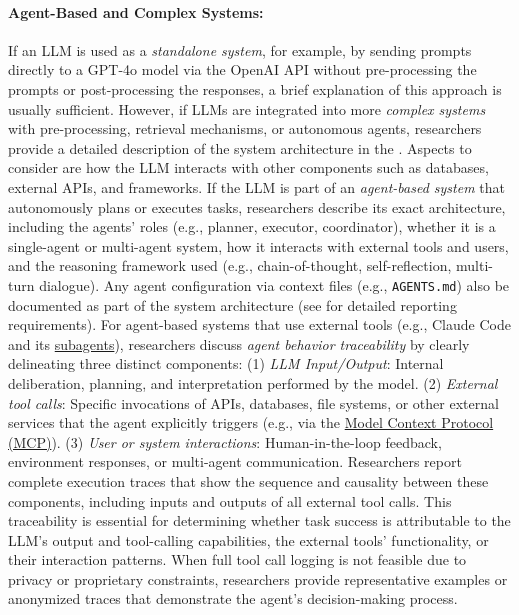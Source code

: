 \paragraph{Agent-Based and Complex Systems:}
If an LLM is used as a \emph{standalone system}, for example, by sending prompts directly to a GPT-4o model via the OpenAI API without pre-processing the prompts or post-processing the responses, a brief explanation of this approach is usually sufficient.
However, if LLMs are integrated into more \emph{complex systems} with pre-processing, retrieval mechanisms, or autonomous agents, researchers \must provide a detailed description of the system architecture in the \paper.
Aspects to consider are how the LLM interacts with other components such as databases, external APIs, and frameworks.
If the LLM is part of an \emph{agent-based system} that autonomously plans or executes tasks, researchers \must describe its exact architecture, including the agents' roles (e.g., planner, executor, coordinator), whether it is a single-agent or multi-agent system, how it interacts with external tools and users, and the reasoning framework used (e.g., chain-of-thought, self-reflection, multi-turn dialogue).
Any agent configuration via context files (e.g., \texttt{AGENTS.md}) \should also be documented as part of the system architecture (see \prompts for detailed reporting requirements).
For agent-based systems that use external tools (e.g., Claude Code and its \href{https://docs.anthropic.com/en/docs/claude-code/sub-agents}{subagents}), researchers \must discuss \emph{agent behavior traceability} by clearly delineating three distinct components: (1) \emph{LLM Input/Output}: Internal deliberation, planning, and interpretation performed by the model. (2) \emph{External tool calls}: Specific invocations of APIs, databases, file systems, or other external services that the agent explicitly triggers (e.g., via the \href{https://modelcontextprotocol.io/}{Model Context Protocol (MCP)}). (3) \emph{User or system interactions}: Human-in-the-loop feedback, environment responses, or multi-agent communication.
Researchers \should report complete execution traces that show the sequence and causality between these components, including inputs and outputs of all external tool calls.
This traceability is essential for determining whether task success is attributable to the LLM's output and tool-calling capabilities, the external tools' functionality, or their interaction patterns.
When full tool call logging is not feasible due to privacy or proprietary constraints, researchers \should provide representative examples or anonymized traces that demonstrate the agent's decision-making process.

